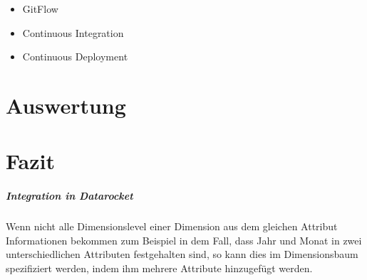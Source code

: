 \documentclass[
  language=german, %
  type=bachelor%
]{isthesis}
\begin{document}
\begin{content}
  \begin{itemize}
    \item GitFlow
    \item Continuous Integration
    \item Continuous Deployment
  \end{itemize}


\chapter{Auswertung}

\chapter{Fazit}
 \paragraph{Integration in Datarocket}
 Wenn nicht alle Dimensionslevel einer Dimension aus dem gleichen Attribut
 Informationen bekommen zum Beispiel in dem Fall, dass Jahr und Monat in zwei
 unterschiedlichen Attributen festgehalten sind, so kann dies im Dimensionsbaum
 spezifiziert werden, indem ihm mehrere Attribute hinzugefügt werden.

  \begin{figure}[caption={DataRockets Datapipeline-Bausteine}, label={}]
  \end{figure}



  

\end{content}
\end{document}
